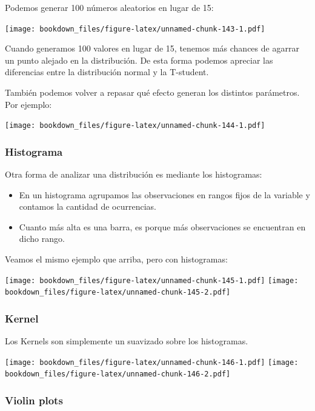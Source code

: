 \documentclass[]{book}
\providecommand{\tightlist}{%
  \setlength{\itemsep}{0pt}\setlength{\parskip}{0pt}}
\begin{document}
Podemos generar 100 números aleatorios en lugar de 15:

\texttt{[image: bookdown\_files/figure-latex/unnamed-chunk-143-1.pdf]}

Cuando generamos 100 valores en lugar de 15, tenemos más chances de agarrar un punto alejado en la distribución. De esta forma podemos apreciar las diferencias entre la distribución normal y la T-student.

También podemos volver a repasar qué efecto generan los distintos parámetros. Por ejemplo:

\texttt{[image: bookdown\_files/figure-latex/unnamed-chunk-144-1.pdf]}

\hypertarget{histograma}{%
\subsubsection{Histograma}\label{histograma}}

Otra forma de analizar una distribución es mediante los histogramas:

\begin{itemize}
\tightlist
\item
  En un histograma agrupamos las observaciones en rangos fijos de la variable y contamos la cantidad de ocurrencias.
\item
  Cuanto más alta es una barra, es porque más observaciones se encuentran en dicho rango.
\end{itemize}

Veamos el mismo ejemplo que arriba, pero con histogramas:

\texttt{[image: bookdown\_files/figure-latex/unnamed-chunk-145-1.pdf]} \texttt{[image: bookdown\_files/figure-latex/unnamed-chunk-145-2.pdf]}

\hypertarget{kernel}{%
\subsubsection{Kernel}\label{kernel}}

Los Kernels son simplemente un suavizado sobre los histogramas.

\texttt{[image: bookdown\_files/figure-latex/unnamed-chunk-146-1.pdf]} \texttt{[image: bookdown\_files/figure-latex/unnamed-chunk-146-2.pdf]}

\hypertarget{violin-plots}{%
\subsubsection{Violin plots}\label{violin-plots}}
\end{document}
